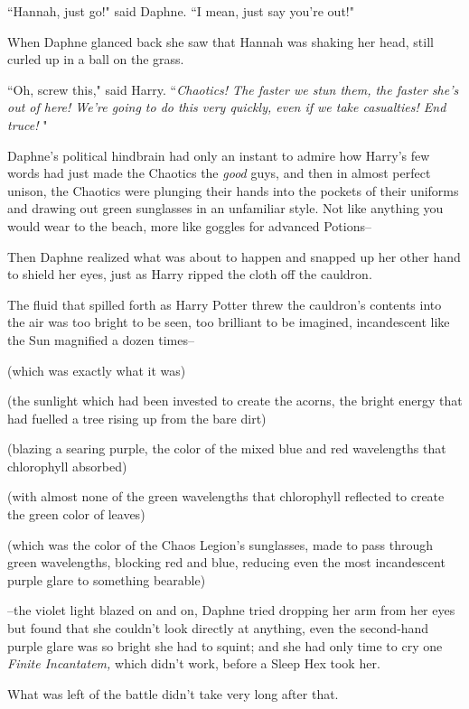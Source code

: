 ``Hannah, just go!" said Daphne. ``I mean, just say you're out!"

When Daphne glanced back she saw that Hannah was shaking her head, still curled up in a ball on the grass.

``Oh, screw this," said Harry. ``\emph{Chaotics! The faster we stun them, the faster she's out of here! We're going to do this very quickly, even if we take casualties! End truce! }"

Daphne's political hindbrain had only an instant to admire how Harry's few words had just made the Chaotics the \emph{good} guys, and then in almost perfect unison, the Chaotics were plunging their hands into the pockets of their uniforms and drawing out green sunglasses in an unfamiliar style. Not like anything you would wear to the beach, more like goggles for advanced Potions\---

Then Daphne realized what was about to happen and snapped up her other hand to shield her eyes, just as Harry ripped the cloth off the cauldron.

The fluid that spilled forth as Harry Potter threw the cauldron's contents into the air was too bright to be seen, too brilliant to be imagined, incandescent like the Sun magnified a dozen times\---

(which was exactly what it was)

(the sunlight which had been invested to create the acorns, the bright energy that had fuelled a tree rising up from the bare dirt)

(blazing a searing purple, the color of the mixed blue and red wavelengths that chlorophyll absorbed)

(with almost none of the green wavelengths that chlorophyll reflected to create the green color of leaves)

(which was the color of the Chaos Legion's sunglasses, made to pass through green wavelengths, blocking red and blue, reducing even the most incandescent purple glare to something bearable)

\---the violet light blazed on and on, Daphne tried dropping her arm from her eyes but found that she couldn't look directly at anything, even the second-hand purple glare was so bright she had to squint; and she had only time to cry one \emph{Finite Incantatem,} which didn't work, before a Sleep Hex took her.

What was left of the battle didn't take very long after that.

\later

